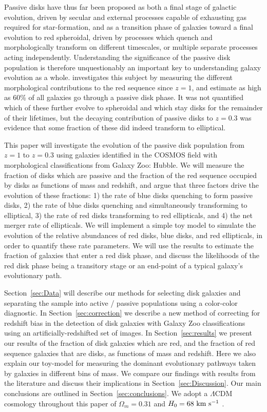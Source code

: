 \documentclass[useAMS,usenatbib]{mn2e}
\begin{document}
Passive disks have thus far been proposed as both a final stage of galactic evolution, driven by secular and external processes capable of exhausting gas required for star-formation, and as a transition phase of galaxies toward a final evolution to red spheroidal, driven by processes which quench and morphologically transform on different timescales, or multiple separate processes acting independently. Understanding the significance of the passive disk population is therefore unquestionably an important key to understanding galaxy evolution as a whole. \citet{Bundy2010} investigates this subject by measuring the different morphological contributions to the red sequence since $z=1$, and estimate as high as 60\% of all galaxies go through a passive disk phase. It was not quantified which of these further evolve to spheroidal and which stay disks for the remainder of their lifetimes, but the decaying contribution of passive disks to $z=0.3$ was evidence that some fraction of these did indeed transform to elliptical.

This paper will investigate the evolution of the passive disk population from $z=1$ to $z=0.3$ using galaxies identified in the COSMOS field with morphological classifications from Galaxy Zoo: Hubble. We will measure the fraction of disks which are passive and the fraction of the red sequence occupied by disks as functions of mass and redshift, and argue that three factors drive the evolution of these fractions: 1) the rate of blue disks quenching to form passive disks, 2) the rate of blue disks quenching and simultaneously transforming to elliptical, 3) the rate of red disks transforming to red ellipticals, and 4) the net merger rate of ellipticals. We will implement a simple toy model to simulate the evolution of the relative abundances of red disks, blue disks, and red ellipticals, in order to quantify these rate parameters. We will use the results to estimate the fraction of galaxies that enter a red disk phase, and discuss the likelihoods of the red disk phase being a transitory stage or an end-point of a typical galaxy's evolutionary path.

Section~\ref{sec:Data} will describe our methods for selecting disk galaxies and separating the sample into active / passive populations using a color-color diagnostic. In Section~\ref{sec:correction} we describe a new method of correcting for redshift bias in the detection of disk galaxies with Galaxy Zoo classifications using an artificially-redshifted set of images. In Section~\ref{sec:results} we present our results of the fraction of disk galaxies which are red, and the fraction of red sequence galaxies that are disks, as functions of mass and redshift. Here we also explain our toy-model for measuring the dominant evolutionary pathways taken by galaxies in different bins of mass. We compare our findings with results from the literature and discuss their implications in Section~\ref{sec:Discussion}. Our main conclusions are outlined in Section~\ref{sec:conclusions}. We adopt a $\Lambda$CDM cosmology throughout this paper of $\Omega_m=0.31$ and $H_0=68~\rm km~s^{-1}$ \citep{PlanckCollaboration2015}.
\end{document}
